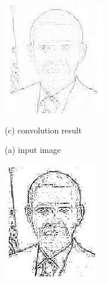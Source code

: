 \documentclass[10pt]{article}
\begin{document}
\includegraphics[max width=\textwidth]{2022_01_06_b5ce182ed1bd5f482e5bg-15(1)}

(c) convolution result

(a) input image

\includegraphics[max width=\textwidth]{2022_01_06_b5ce182ed1bd5f482e5bg-15(2)}
\end{document}
